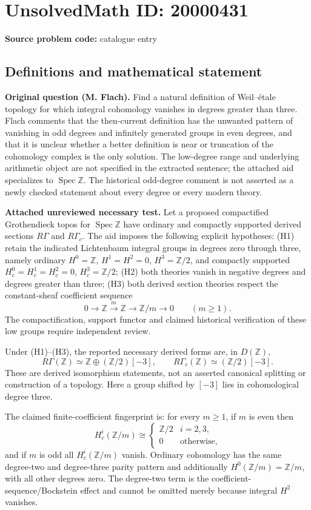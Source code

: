 \documentclass[11pt]{article}
\newcommand{\Z}{\mathbb{Z}}
\begin{document}
\section*{UnsolvedMath ID: 20000431}
\textbf{Source problem code:} catalogue entry
\subsection{Definitions and mathematical statement}
\textbf{Original question (M. Flach).} Find a natural definition of Weil--étale topology for which integral cohomology vanishes in degrees greater than three. Flach comments that the then-current definition has the unwanted pattern of vanishing in odd degrees and infinitely generated groups in even degrees, and that it is unclear whether a better definition is near or truncation of the cohomology complex is the only solution. The low-degree range and underlying arithmetic object are not specified in the extracted sentence; the attached aid specializes to $\operatorname{Spec}\Z$. The historical odd-degree comment is not asserted as a newly checked statement about every degree or every modern theory.

\textbf{Attached unreviewed necessary test.} Let a proposed compactified Grothendieck topos for $\operatorname{Spec}\Z$ have ordinary and compactly supported derived sections $R\Gamma$ and $R\Gamma_c$. The aid imposes the following explicit hypotheses: (H1) retain the indicated Lichtenbaum integral groups in degrees zero through three, namely ordinary $H^0=\Z$, $H^1=H^2=0$, $H^3=\Z/2$, and compactly supported $H_c^0=H_c^1=H_c^2=0$, $H_c^3=\Z/2$; (H2) both theories vanish in negative degrees and degrees greater than three; (H3) both derived section theories respect the constant-sheaf coefficient sequence
\[0\longrightarrow\Z\xrightarrow{m}\Z\longrightarrow\Z/m\longrightarrow0\qquad(m\ge1).\]
The compactification, support functor and claimed historical verification of these low groups require independent review.

Under (H1)--(H3), the reported necessary derived forms are, in $D(\Z)$,
\[R\Gamma(\Z)\simeq\Z\oplus(\Z/2)[-3],\qquad R\Gamma_c(\Z)\simeq(\Z/2)[-3].\]
These are derived isomorphism statements, not an asserted canonical splitting or construction of a topology. Here a group shifted by $[-3]$ lies in cohomological degree three.

The claimed finite-coefficient fingerprint is: for every $m\ge1$, if $m$ is even then
\[H_c^i(\Z/m)\cong\begin{cases}\Z/2&i=2,3,\\0&\text{otherwise},\end{cases}\]
and if $m$ is odd all $H_c^i(\Z/m)$ vanish. Ordinary cohomology has the same degree-two and degree-three parity pattern and additionally $H^0(\Z/m)=\Z/m$, with all other degrees zero. The degree-two term is the coefficient-sequence/Bockstein effect and cannot be omitted merely because integral $H^2$ vanishes.
\end{document}
